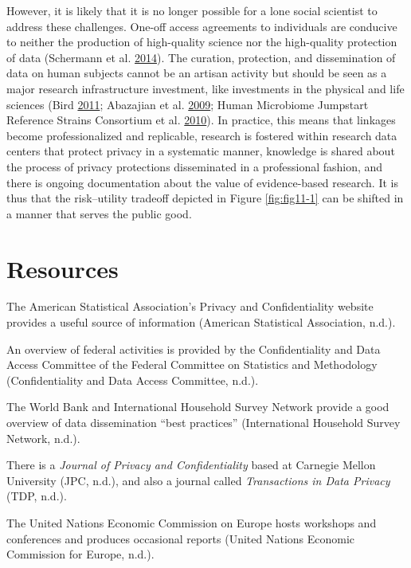 \documentclass[]{krantz}
\begin{document}
However, it is likely that it is no longer possible for a lone social
scientist to address these challenges. One-off access agreements to
individuals are conducive to neither the production of high-quality
science nor the high-quality protection of data (Schermann et al.
\protect\hyperlink{ref-schermann2014big}{2014}). The curation,
protection, and dissemination of data on human subjects cannot be an
artisan activity but should be seen as a major research infrastructure
investment, like investments in the physical and life sciences (Bird
\protect\hyperlink{ref-bird2011computing}{2011}; Abazajian et al.
\protect\hyperlink{ref-abazajian2009seventh}{2009}; Human Microbiome
Jumpstart Reference Strains Consortium et al.
\protect\hyperlink{ref-human2010catalog}{2010}). In practice, this means
that linkages become professionalized and replicable, research is
fostered within research data centers that protect privacy in a
systematic manner, knowledge is shared about the process of privacy
protections disseminated in a professional fashion, and there is ongoing
documentation about the value of evidence-based research. It is thus
that the risk--utility tradeoff depicted in Figure \ref{fig:fig11-1} can
be shifted in a manner that serves the public good.

\section{Resources}\label{resources-6}

The American Statistical Association's Privacy and Confidentiality
website provides a useful source of information (American Statistical
Association, n.d.).

An overview of federal activities is provided by the Confidentiality and
Data Access Committee of the Federal Committee on Statistics and
Methodology (Confidentiality and Data Access Committee, n.d.).

The World Bank and International Household Survey Network provide a good
overview of data dissemination ``best practices'' (International
Household Survey Network, n.d.).

There is a \emph{Journal of Privacy and Confidentiality} based at
Carnegie Mellon University (JPC, n.d.), and also a journal called
\emph{Transactions in Data Privacy} (TDP, n.d.).

The United Nations Economic Commission on Europe hosts workshops and
conferences and produces occasional reports (United Nations Economic
Commission for Europe, n.d.).
\end{document}

